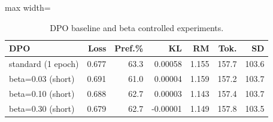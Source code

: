 \begin{table}[!htbp]
\centering
\scriptsize
\setlength{\tabcolsep}{3.4pt}
\begin{adjustbox}{max width=\linewidth}
\begin{tabular}{lrrrrrr}
\toprule
DPO & Loss & Pref.\% & KL & RM & Tok. & SD \\
\midrule
standard (1 epoch) & 0.677 & 63.3 & 0.00058 & 1.155 & 157.7 & 103.6 \\
beta=0.03 (short) & 0.691 & 61.0 & 0.00004 & 1.159 & 157.2 & 103.7 \\
beta=0.10 (short) & 0.688 & 62.7 & 0.00003 & 1.143 & 157.4 & 103.7 \\
beta=0.30 (short) & 0.679 & 62.7 & -0.00001 & 1.149 & 157.8 & 103.5 \\
\bottomrule
\end{tabular}

\end{adjustbox}
\caption{DPO baseline and beta controlled experiments.}
\label{tab:dpo-summary}

\end{table}
